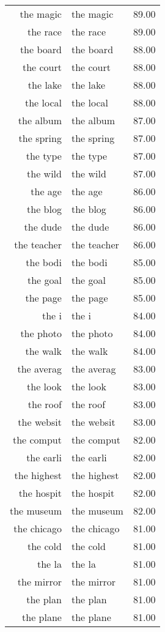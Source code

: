 \begin{table}[ht]
\begin{tabular}{rlr}
  the magic & the magic & 89.00 \\ 
  the race & the race & 89.00 \\ 
  the board & the board & 88.00 \\ 
  the court & the court & 88.00 \\ 
  the lake & the lake & 88.00 \\ 
  the local & the local & 88.00 \\ 
  the album & the album & 87.00 \\ 
  the spring & the spring & 87.00 \\ 
  the type & the type & 87.00 \\ 
  the wild & the wild & 87.00 \\ 
  the age & the age & 86.00 \\ 
  the blog & the blog & 86.00 \\ 
  the dude & the dude & 86.00 \\ 
  the teacher & the teacher & 86.00 \\ 
  the bodi & the bodi & 85.00 \\ 
  the goal & the goal & 85.00 \\ 
  the page & the page & 85.00 \\ 
  the i & the i & 84.00 \\ 
  the photo & the photo & 84.00 \\ 
  the walk & the walk & 84.00 \\ 
  the averag & the averag & 83.00 \\ 
  the look & the look & 83.00 \\ 
  the roof & the roof & 83.00 \\ 
  the websit & the websit & 83.00 \\ 
  the comput & the comput & 82.00 \\ 
  the earli & the earli & 82.00 \\ 
  the highest & the highest & 82.00 \\ 
  the hospit & the hospit & 82.00 \\ 
  the museum & the museum & 82.00 \\ 
  the chicago & the chicago & 81.00 \\ 
  the cold & the cold & 81.00 \\ 
  the la & the la & 81.00 \\ 
  the mirror & the mirror & 81.00 \\ 
  the plan & the plan & 81.00 \\ 
  the plane & the plane & 81.00 \\ 

\end{tabular}
\end{table}
